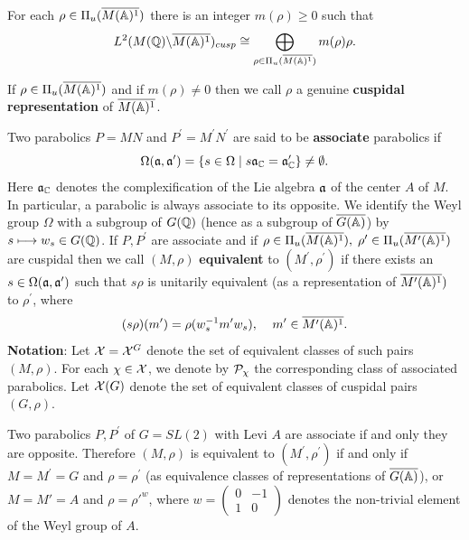 \begin{proposition}
For each $\rho \in \Pi _u(\overline{M({\Bbb{A}})^1})$
there is an integer $m(\rho )\geq 0$ such that 
\[
L^2(M({{\Bbb{Q}}})\backslash \overline{M({\Bbb{A}})^1})_{cusp}\cong
\bigoplus_{\rho \in \Pi _u(\overline{M({\Bbb{A}})^1})}m(\rho )\rho .
\]
\end{proposition}

If
$\rho \in \Pi _u(\overline{M({\Bbb{A}})^1})$ and if $m(\rho )\neq 0$
then we call $\rho $ a genuine {\bf cuspidal
representation} of $\overline{M({\Bbb{A}})^1}$.

Two parabolics $P=MN$ and $P^{\prime }=M^{\prime }N^{\prime }$ are said to
be {\bf associate} parabolics if 
\[
\Omega ({\frak{a}},{\frak{a}}^{\prime })
=\{s\in \Omega \;|\;s{\frak{a}}_{{\Bbb C}}
={\frak{a}}_{{\Bbb C}}^{\prime }\}\neq \emptyset . 
\]
Here ${\frak{a}}_{\Bbb{C}}$ denotes the
complexification of the Lie algebra
${\frak{a}}$ of the center $A$ of $M$. In particular, a parabolic is
always associate to its opposite.
We identify the Weyl group $\Omega$ with a
subgroup of $G({\Bbb{Q}})$ (hence as a subgroup of
$\overline{G({\Bbb{A}})}$) by $s\longmapsto w_s\in G({\Bbb{Q}})$.
If $P,P^{\prime }$ are associate and if 
$\rho \in \Pi _u(\overline{M({\Bbb{A}})^1}),
\;\rho ^{\prime }\in \Pi _u(\overline{M^{\prime }({\Bbb{A}})^1})$
are cuspidal then we call $(M,\rho )$ {\bf equivalent} to
$(M^{\prime },\rho ^{\prime })$ if there exists an
$s\in \Omega ({\frak{a}}, {\frak{a}}^{\prime })$ such that
$s\rho $ is unitarily equivalent (as a
representation of $\overline{M^{\prime }({\Bbb{A}})^1})$
to $\rho ^{\prime }$, where 
\[
(s\rho )(m^{\prime })=\rho (w_s^{-1}m^{\prime }w_s),
\;\;\;\;m^{\prime }\in \overline{M^{\prime }({{\Bbb{A}}})^1}. 
\]
{\bf Notation}:
Let ${\cal{X}}={\cal{X}}^G$ denote the set of equivalent classes of such
pairs $(M,\rho )$.
For each $\chi \in {\cal X}$, we denote by
${\cal P}_\chi $ the corresponding class of associated parabolics.
Let ${\cal{X}}(G)$ denote the set of equivalent classes of
cuspidal pairs $(G,\rho )$.

\begin{example}
Two parabolics $P,P^{\prime }$ of $G=SL(2)$ with Levi $A$
are associate if and only they are opposite.
Therefore $(M,\rho )$ is equivalent to $(M^{\prime },\rho ^{\prime })$
if and only if $M=M^{\prime }=G$ and $\rho =\rho ^{\prime }$
(as equivalence classes of representations of
$\overline{G({\Bbb{A}})}$),
or $M=M'=A$ and $\rho ={\rho'}^w$, where 
$w=
\left(
\begin{array}{cc}
0 &-1\\
1&0
\end{array}
\right)$
denotes the non-trivial element of the Weyl group of $A$.
\end{example}

